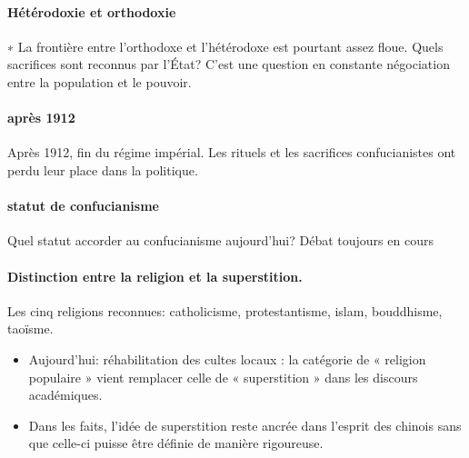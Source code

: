 \paragraph{Hétérodoxie et orthodoxie} ∗ La frontière entre l’orthodoxe et l’hétérodoxe est pourtant assez floue. Quels sacrifices sont reconnus par l’État? C’est une question en constante négociation entre la population et le pouvoir.

\paragraph{après 1912}Après 1912, fin du régime impérial.
Les rituels et les sacrifices confucianistes ont perdu leur place dans la politique.

\paragraph{statut de confucianisme} Quel statut accorder au confucianisme aujourd’hui? Débat toujours en cours
\paragraph{Distinction entre la religion et la superstition.}
Les cinq religions reconnues: catholicisme, protestantisme, islam, bouddhisme, taoïsme.

\begin{itemize}
    \item  	Aujourd’hui: réhabilitation des cultes locaux : la catégorie de
« religion populaire » vient remplacer celle de « superstition » dans les discours académiques.
   \item 	Dans les faits, l’idée de superstition reste ancrée dans l’esprit des chinois sans que celle-ci puisse être définie de manière rigoureuse.
\end{itemize}

